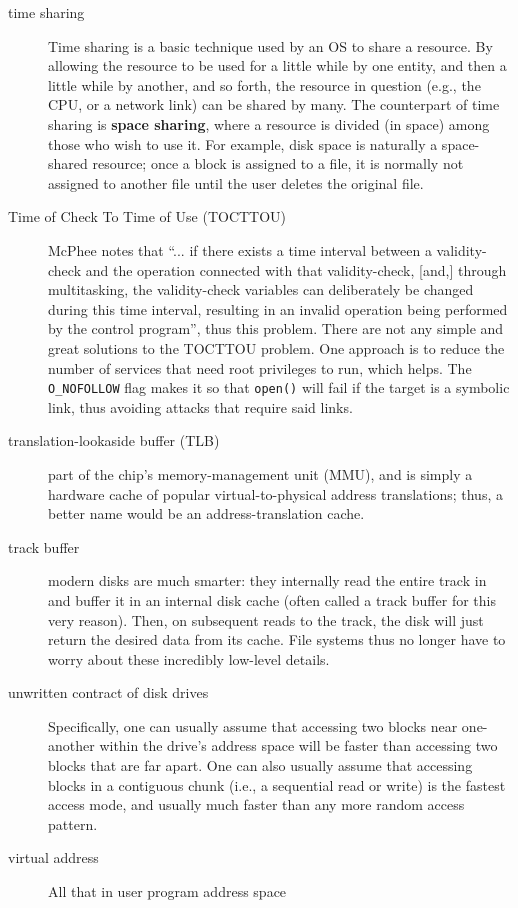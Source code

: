\begin{description}
\item[time sharing] Time sharing is a basic technique used by an OS to share a resource. By allowing the resource to be used for a little while by one entity, and then a little while by another, and so forth, the resource in question (e.g., the CPU, or a network link) can be shared by many. The counterpart of time sharing is \textbf{space sharing}, where a resource is divided (in space) among those who wish to use it. For example, disk space is naturally a space-shared resource; once a block is assigned to a file, it is normally not assigned to another file until the user deletes the original file.

\item[Time of Check To Time of Use (TOCTTOU)] McPhee notes that ``... if there exists a time interval between a validity-check and the operation connected with that validity-check, [and,] through multitasking, the validity-check variables can deliberately be changed during this time interval, resulting in an invalid operation being performed by the control program'', thus this problem.  There are not any simple and great solutions to the TOCTTOU problem. One approach is to reduce the number of services that need root privileges to run, which helps. The \texttt{O\_NOFOLLOW} flag makes it so that \texttt{open()} will fail if the target is a symbolic link, thus avoiding attacks that require said links.

\item[translation-lookaside buffer (TLB)] part of the chip’s memory-management unit (MMU), and is simply a hardware cache of popular virtual-to-physical address translations; thus, a better name would be an address-translation cache.

\item[track buffer] modern disks are much smarter: they internally read the entire track in and buffer it in an internal disk cache (often called a track buffer for this very reason). Then, on subsequent reads to the track, the disk will just return the desired data from its cache. File systems thus no longer have to worry about these incredibly low-level details.


\item[unwritten contract of disk drives] Specifically, one can usually assume that accessing two blocks near one-another within the drive’s address space will be faster than accessing two blocks that are far apart. One can also usually assume that accessing blocks in a contiguous chunk (i.e., a sequential read or write) is the fastest access mode, and usually much faster than any more random access pattern.

\item[virtual address] All that in user program address space

\end{description}
